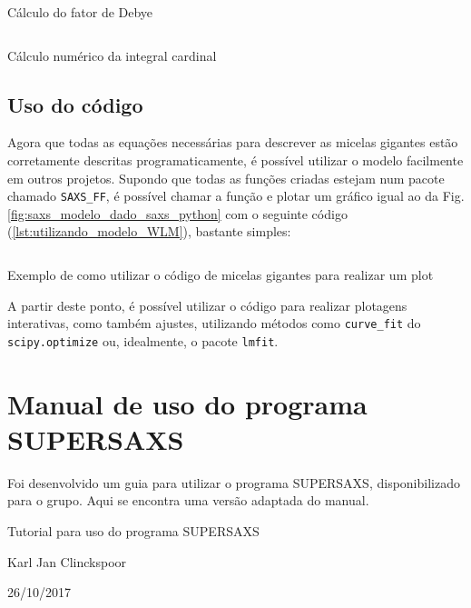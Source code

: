 \begin{apendicesenv}
\begin{listing}[H]
	\inputminted{python}{./python/cadeia_kratky_porod_inicial_4.py}
	\caption{Cálculo do fator de Debye}
	\label{lst:cadeia_KP_Debye}
\end{listing}

\begin{listing}[H]
	\inputminted{python}{./python/cadeia_kratky_porod_inicial_5.py}
	\caption{Cálculo numérico da integral cardinal}  %
	\label{lst:cadeia_KP_SI}
\end{listing}

\section{Uso do código}

Agora que todas as equações necessárias para descrever as micelas gigantes estão corretamente descritas programaticamente, é possível utilizar o modelo facilmente em outros projetos. Supondo que todas as funções criadas estejam num pacote chamado \texttt{SAXS\_FF}, é possível chamar a função e plotar um gráfico igual ao da Fig. \ref{fig:saxs_modelo_dado_saxs_python} com o seguinte código (\ref{lst:utilizando_modelo_WLM}), bastante simples:

\begin{listing}[H]
	\inputminted{python}{./python/uso_modelo.py}
	\caption{Exemplo de como utilizar o código de micelas gigantes para realizar um plot}  %
	\label{lst:utilizando_modelo_WLM}
\end{listing}

A partir deste ponto, é possível utilizar o código para realizar plotagens interativas, como também ajustes, utilizando métodos como \texttt{curve\_fit} do \texttt{scipy.optimize} ou, idealmente, o pacote \texttt{lmfit}.

\chapter{Manual de uso do programa SUPERSAXS}
\label{sec:manual_SUPERSAXS}
Foi desenvolvido um guia para utilizar o programa SUPERSAXS, disponibilizado para o grupo. Aqui se encontra uma versão adaptada do manual.

\begin{center}
	\Huge{Tutorial para uso do programa SUPERSAXS}
	
	\Large{Karl Jan Clinckspoor}
	
	\large{26/10/2017}
\end{center}


\end{apendicesenv}
